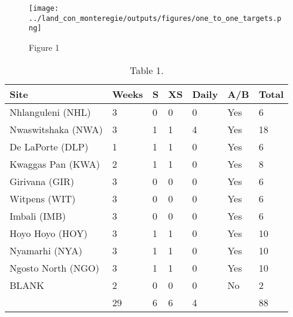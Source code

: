 \begin{figure}[!ht]
  \centering
    \texttt{[image: ../land\_con\_monteregie/outputs/figures/one\_to\_one\_targets.png]}
  \caption{Figure 1}
  \label{fig:map}
\end{figure}

\begin{table}[h!]
\centering
\begin{tabular}{llllll|l}
  \hline
  \hline
  Site & Weeks & S & XS & Daily & A/B & Total\\
  \hline
  Nhlanguleni (NHL) 	& 3 & 0 & 0 & 0 & Yes & 6 \\
  Nwaswitshaka (NWA) 	& 3 & 1 & 1 & 4 & Yes & 18 \\
  De LaPorte (DLP) 		& 1 & 1 & 1 & 0 & Yes & 6 \\
  Kwaggas Pan (KWA) 	& 2 & 1 & 1 & 0 & Yes & 8\\
  Girivana (GIR) 		& 3 & 0 & 0 & 0 & Yes & 6 \\
  Witpens (WIT) 		& 3 & 0 & 0 & 0 & Yes & 6 \\
  Imbali (IMB) 			& 3 & 0 & 0 & 0 & Yes & 6 \\
  Hoyo Hoyo (HOY) 		& 3 & 1 & 1 & 0 & Yes & 10 \\
  Nyamarhi (NYA) 		& 3 & 1 & 1 & 0 & Yes & 10 \\
  Ngosto North (NGO) 	& 3 & 1 & 1 & 0 & Yes &10 \\
  BLANK 				& 2 & 0 & 0 & 0 & No & 2 \\
  \hline
   						& 29 & 6 & 6 & 4 & & 88 \\
  \hline
  \hline
\end{tabular}
\caption{Table 1.}
\label{tab:samples}
\end{table}
